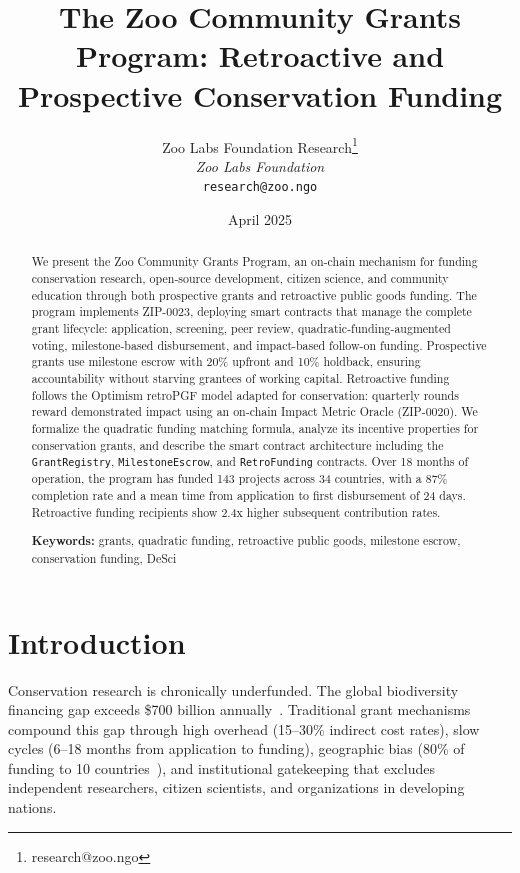 \documentclass[11pt,letterpaper]{article}
\title{\textbf{The Zoo Community Grants Program: Retroactive and Prospective Conservation Funding}}
\author{
Zoo Labs Foundation Research\thanks{research@zoo.ngo}\\
\textit{Zoo Labs Foundation}\\
\texttt{research@zoo.ngo}
}
\date{April 2025}
\begin{document}
\zoocoverpage

\begin{abstract}
We present the Zoo Community Grants Program, an on-chain mechanism for funding conservation research, open-source development, citizen science, and community education through both prospective grants and retroactive public goods funding. The program implements ZIP-0023, deploying smart contracts that manage the complete grant lifecycle: application, screening, peer review, quadratic-funding-augmented voting, milestone-based disbursement, and impact-based follow-on funding. Prospective grants use milestone escrow with 20\% upfront and 10\% holdback, ensuring accountability without starving grantees of working capital. Retroactive funding follows the Optimism retroPGF model adapted for conservation: quarterly rounds reward demonstrated impact using an on-chain Impact Metric Oracle (ZIP-0020). We formalize the quadratic funding matching formula, analyze its incentive properties for conservation grants, and describe the smart contract architecture including the \texttt{GrantRegistry}, \texttt{MilestoneEscrow}, and \texttt{RetroFunding} contracts. Over 18 months of operation, the program has funded 143 projects across 34 countries, with a 87\% completion rate and a mean time from application to first disbursement of 24 days. Retroactive funding recipients show 2.4x higher subsequent contribution rates.

\medskip
\noindent\textbf{Keywords:} grants, quadratic funding, retroactive public goods, milestone escrow, conservation funding, DeSci
\end{abstract}

\newpage
\tableofcontents
\newpage

\section{Introduction}
\label{sec:intro}

Conservation research is chronically underfunded. The global biodiversity financing gap exceeds \$700 billion annually~\cite{unep2021financing}. Traditional grant mechanisms compound this gap through high overhead (15--30\% indirect cost rates), slow cycles (6--18 months from application to funding), geographic bias (80\% of funding to 10 countries~\cite{unesco2021science}), and institutional gatekeeping that excludes independent researchers, citizen scientists, and organizations in developing nations.
\end{document}
